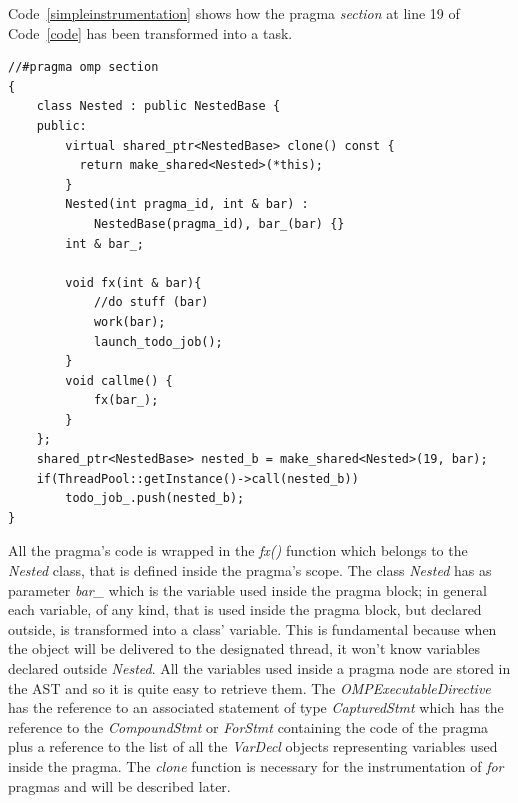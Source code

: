 \documentclass[a4paper,11pt,oneside]{book}
\begin{document}
Code~\ref{simpleinstrumentation} shows how the pragma \emph{section} at line 19 of Code~\ref{code} has been transformed into a task.

\begin{lstlisting}[language=CCC, caption=Example of an instrumented \emph{section} pragma from Code~\ref{code}., label=simpleinstrumentation]
 //#pragma omp section
{
    class Nested : public NestedBase {
    public: 
        virtual shared_ptr<NestedBase> clone() const { 
          return make_shared<Nested>(*this); 
        } 
        Nested(int pragma_id, int & bar) : 
            NestedBase(pragma_id), bar_(bar) {}
        int & bar_;
            
        void fx(int & bar){   
            //do stuff (bar)
            work(bar);
            launch_todo_job(); 
        }
        void callme() {
            fx(bar_);
        }
    };
    shared_ptr<NestedBase> nested_b = make_shared<Nested>(19, bar);                             
    if(ThreadPool::getInstance()->call(nested_b)) 
        todo_job_.push(nested_b); 
}
\end{lstlisting}

All the pragma’s code is wrapped in the \emph{fx()} function which belongs to the \emph{Nested} class, that is defined inside the pragma’s scope. The class \emph{Nested} has as parameter \emph{bar\_} which is the variable used inside the pragma block; in general each variable, of any kind, that is used inside the pragma block, but declared outside, is transformed into a class’ variable. This is fundamental because when the object will be delivered to the designated thread, it won’t know variables declared outside \emph{Nested}. All the variables used inside a pragma node are stored in the AST and so it is quite easy to retrieve them. The \emph{OMPExecutableDirective} has the reference to an associated statement of type \emph{CapturedStmt} which has the reference to the \emph{CompoundStmt} or \emph{ForStmt} containing the code of the pragma plus a reference to the list of all the \emph{VarDecl} objects representing variables used inside the pragma. The \emph{clone} function is necessary for the instrumentation of \emph{for} pragmas and will be described later.
\end{document}
